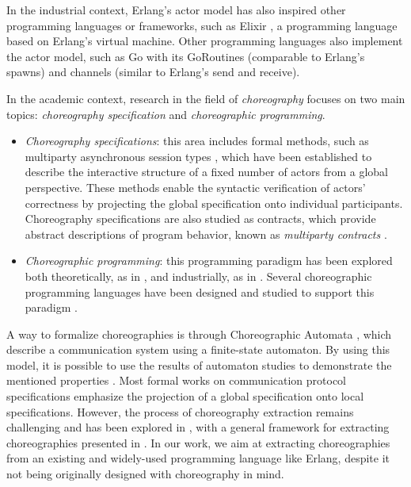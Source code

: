 \label{sota}
In the industrial context, Erlang's actor model has also inspired other programming languages or frameworks, such as Elixir \cite{website:elixir}, a programming language based on Erlang's virtual machine. Other programming languages also implement the actor model, such as Go \cite{website:golang} with its GoRoutines (comparable to Erlang's spawns) and channels (similar to Erlang's send and receive).

\bigskip

In the academic context, research in the field of \textit{choreography} focuses on two main topics: \textit{choreography specification} and \textit{choreographic programming}.
\begin{itemize}
    \item \textit{Choreography specifications}: this area includes formal methods, such as multiparty asynchronous session types \cite{honda2008multiparty}, which have been established to describe the interactive structure of a fixed number of actors from a global perspective. These methods enable the syntactic verification of actors' correctness by projecting the global specification onto individual participants. Choreography specifications are also studied as contracts, which provide abstract descriptions of program behavior, known as \textit{multiparty contracts} \cite{zava}.
    \item \textit{Choreographic programming}: this programming paradigm has been explored both theoretically, as in \cite{website:wscdl}, and industrially, as in \cite{website:bpmn}. Several choreographic programming languages have been designed and studied to support this paradigm \cite{montesi2010jolie, montesi2014choreographic, giallorenzo2020object, dalla2014aiocj}.
\end{itemize}

A way to formalize choreographies is through Choreographic Automata \cite{barbanerachoreography}, which describe a communication system using a finite-state automaton. By using this model, it is possible to use the results of automaton studies to demonstrate the mentioned properties \cite{orlando2021corinne}. Most formal works on communication protocol specifications emphasize the projection of a global specification onto local specifications. However, the process of choreography extraction remains challenging and has been explored in \cite{cruz2017paths}, with a general framework for extracting choreographies presented in \cite{cruz2022implementing}. In our work, we aim at extracting choreographies from an existing and widely-used programming language like Erlang, despite it not being originally designed with choreography in mind.